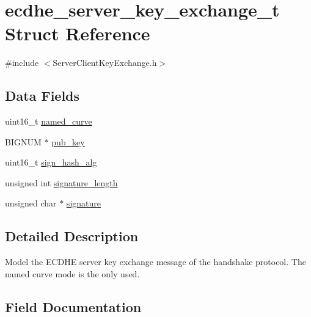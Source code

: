\hypertarget{structecdhe__server__key__exchange__t}{}\section{ecdhe\+\_\+server\+\_\+key\+\_\+exchange\+\_\+t Struct Reference}
\label{structecdhe__server__key__exchange__t}


{\ttfamily \#include $<$Server\+Client\+Key\+Exchange.\+h$>$}

\subsection*{Data Fields}
\begin{DoxyCompactItemize}
\item 
uint16\+\_\+t \hyperlink{structecdhe__server__key__exchange__t_a5754cc60d6f7a74a313db0e4bc607b07}{named\+\_\+curve}
\item 
B\+I\+G\+N\+UM $\ast$ \hyperlink{structecdhe__server__key__exchange__t_aad713005343ebfb84e09a7441d655802}{pub\+\_\+key}
\item 
uint16\+\_\+t \hyperlink{structecdhe__server__key__exchange__t_a07ea01aadbb81f38a9a27e324d11f54e}{sign\+\_\+hash\+\_\+alg}
\item 
unsigned int \hyperlink{structecdhe__server__key__exchange__t_a23a683d5129246d9adbd0029612d06a8}{signature\+\_\+length}
\item 
unsigned char $\ast$ \hyperlink{structecdhe__server__key__exchange__t_a775505f2a74638cda44fdd79c4e07993}{signature}
\end{DoxyCompactItemize}


\subsection{Detailed Description}
Model the E\+C\+D\+HE server key exchange message of the handshake protocol. The named curve mode is the only used. 

\subsection{Field Documentation}
